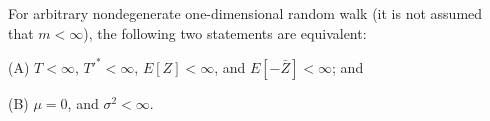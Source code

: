 For arbitrary nondegenerate one-dimensional random walk (it is not assumed that $m < \infty$), the following two statements are equivalent:

(A) $T < \infty$, $T'^* < \infty$, $E[Z] < \infty$, and $E[-\bar{Z}] < \infty$;
and

(B) $\mu = 0$, and $\sigma^2 < \infty$.